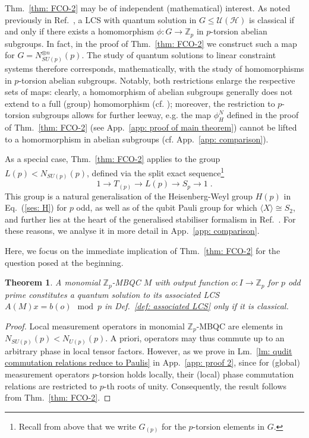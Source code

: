 \documentclass[aps,pra,letterpaper,onrcolumn,nofootinbib,notitlepage,longbibliography]{revtex4-1}
\newtheorem{theorem}{Theorem}
\newcommand{\mf}[1]{#1}
\newcommand{\UH}{\mc{U}(\cH)}
\newcommand{\ra}{\ensuremath{\rightarrow}}
\newcommand{\zz}{\mathbb Z}
\newcommand\mc[1]{\mathcal{#1}}
\newcommand{\cH}{\mc{H}}
\begin{document}
Thm.~\ref{thm: FCO-2} may be of independent (mathematical) interest. As noted previously in Ref.~\cite{FrembsChungOkay2022}, a LCS with quantum solution in $G\leq\UH$ is classical if and only if there exists a homomorphism $\phi:G\ra\zz_p$ in $p$-torsion abelian subgroups. In fact, in the proof of Thm.~\ref{thm: FCO-2} we construct such a map for $G=N^{\otimes n}_{SU(p)}(p)$. The study of quantum solutions to linear constraint systems therefore corresponds, mathematically, with the study of homomorphisms in $p$-torsion abelian subgroups. Notably, both restrictions enlarge the respective sets of maps: clearly, a homomorphism of abelian subgroups generally does not extend to a full (group) homomorphism (cf. \cite{Semrl2008}); moreover, the restriction to $p$-torsion subgroups allows for further leeway, \mf{e.g. the map $\phi^N_H$ defined in the proof of Thm.~\ref{thm: FCO-2} (see App.~\ref{app: proof of main theorem}) cannot be lifted to a homormorphism in abelian subgroups (cf. App.~\ref{app: comparison}).}

As a special case, Thm.~\ref{thm: FCO-2} applies to the group $L(p)<N_{SU(p)}(p)$, defined via the split exact sequence\footnote{Recall from above that we write $G_{(p)}$ for the $p$-torsion elements in $G$.}
\begin{equation}\label{ses: L}
    1 \ra T_{(p)} \ra L(p) \ra S_p \ra 1\; .
\end{equation}
This group is a natural generalisation of the Heisenberg-Weyl group $H(p)$ in Eq.~(\ref{ses: H}) for $p$ odd, as well as of the qubit Pauli group for which $\langle X\rangle\cong S_2$, and further lies at the heart of the generalised stabiliser formalism in Ref.~\cite{VanDenNest2011,vanDenNest2013,BermejoVegaVanDenNest2014}. For these reasons, we analyse it in more detail in App.~\ref{app: comparison}.

Here, we focus on the immediate implication of Thm.~\ref{thm: FCO-2} for the question posed at the beginning.

\begin{theorem}\label{thm: no qsol from MBQC}
    A monomial $\zz_p$-MBQC $M$ with output function $o:I\ra\zz_p$ for $p$ odd prime constitutes a quantum solution to its associated LCS $A(M)x=b(o)\mod p$ in Def.~\ref{def: associated LCS} only if it is classical.
\end{theorem}

\begin{proof}
    Local measurement operators in monomial $\zz_p$-MBQC are elements in $N_{SU(p)}(p)<N_{U(p)}(p)$. A priori, operators may thus commute up to an arbitrary phase in local tensor factors. However, as we prove in Lm.~\ref{lm: qudit commutation relations reduce to Paulis} in App.~\ref{app: proof 2}, since for (global) measurement operators $p$-torsion holds locally, their (local) phase commutation relations are restricted to $p$-th roots of unity.  Consequently, the result follows from Thm.~\ref{thm: FCO-2}.
\end{proof}
\end{document}
